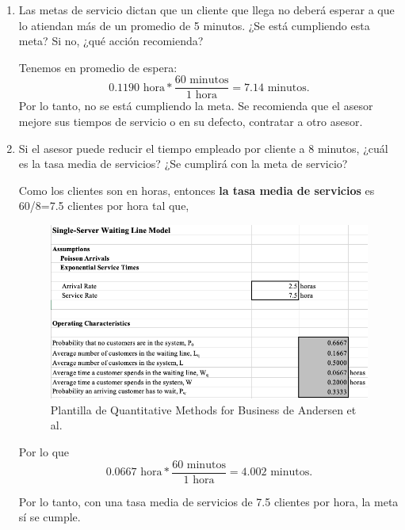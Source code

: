 \begin{problema}
\begin{enumerate}
		\item Las metas de servicio dictan que un cliente que llega no deberá esperar a que lo atiendan más de un promedio de 5 minutos. ¿Se está cumpliendo esta meta? Si no, ¿qué acción recomienda?
		\begin{sol}
			Tenemos en promedio de espera: 
			$$0.1190 \text{ hora}*\frac{60 \text{ minutos}}{1 \text{ hora}}= 7.14 \text{ minutos}. $$
			Por lo tanto, no se está cumpliendo la meta. Se recomienda que el asesor mejore sus tiempos de servicio o en su defecto, contratar a otro asesor. 
		\end{sol}
		\item Si el asesor puede reducir el tiempo empleado por cliente a 8 minutos, ¿cuál es la tasa media de servicios? ¿Se cumplirá con la meta de servicio?
		\begin{sol}
			Como los clientes son en horas, entonces \textbf{la tasa media de servicios} es 60/8=7.5 clientes por hora tal que, 
			\begin{figure}[H]
				\centering
				\includegraphics[scale=0.4]{Images/4}
				\caption{Plantilla de Quantitative Methods for Business de Andersen et al. }
			\end{figure}
		Por lo que 
				$$0.0667\text{ hora}*\frac{60 \text{ minutos}}{1 \text{ hora}}= 4.002 \text{ minutos}. $$
		\end{sol}
	Por lo tanto, con una tasa media de servicios de 7.5 clientes por hora, la meta sí se cumple. 
	\end{enumerate}
	
\end{problema}


